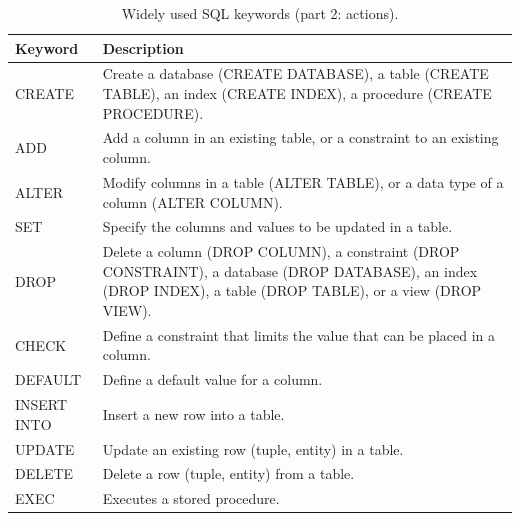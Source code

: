 \begin{table}
	\centering \caption{Widely used SQL keywords (part 2: actions).}\label{ch:db:tab:sqlkeywords2}
	\begin{tabularx}{\textwidth}{lX}
		\hline
		Keyword & Description \\ \hline
		CREATE & Create a database (CREATE DATABASE), a table (CREATE TABLE), an index (CREATE INDEX), a procedure (CREATE PROCEDURE). \\ \hdashline
		ADD & Add a column in an existing table, or a constraint to an existing column. \\ \hdashline
		ALTER & Modify columns in a table (ALTER TABLE), or a data type of a column (ALTER COLUMN). \\ \hdashline
		SET & Specify the columns and values to be updated in a table. \\ \hdashline
		DROP & Delete a column (DROP COLUMN), a constraint (DROP CONSTRAINT), a database (DROP DATABASE), an index (DROP INDEX), a table (DROP TABLE), or a view (DROP VIEW). \\ \hdashline
		CHECK & Define a constraint that limits the value that can be placed in a column. \\ \hdashline
		DEFAULT & Define a default value for a column. \\ \hdashline
		INSERT INTO & Insert a new row into a table. \\ \hdashline
		UPDATE & Update an existing row (tuple, entity) in a table. \\ \hdashline
		DELETE & Delete a row (tuple, entity) from a table. \\ \hdashline
		EXEC & Executes a stored procedure. \\ \hline
	\end{tabularx}
\end{table}

